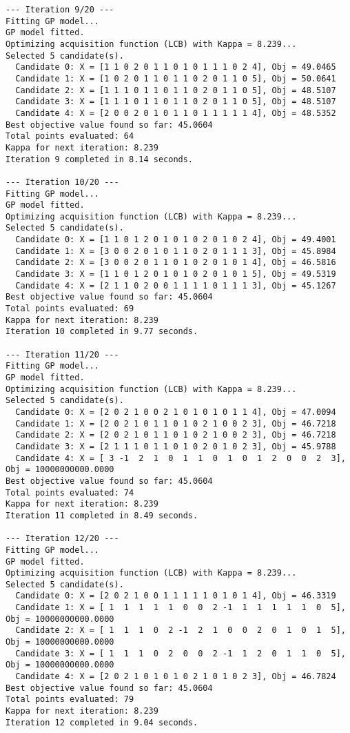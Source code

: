 \documentclass[
  letterpaper,
  DIV=11,
  numbers=noendperiod]{scrartcl}
\begin{document}
\begin{verbatim}
--- Iteration 9/20 ---
Fitting GP model...
GP model fitted.
Optimizing acquisition function (LCB) with Kappa = 8.239...
Selected 5 candidate(s).
  Candidate 0: X = [1 1 0 2 0 1 1 0 1 0 1 1 1 0 2 4], Obj = 49.0465
  Candidate 1: X = [1 0 2 0 1 1 0 1 1 0 2 0 1 1 0 5], Obj = 50.0641
  Candidate 2: X = [1 1 1 0 1 1 0 1 1 0 2 0 1 1 0 5], Obj = 48.5107
  Candidate 3: X = [1 1 1 0 1 1 0 1 1 0 2 0 1 1 0 5], Obj = 48.5107
  Candidate 4: X = [2 0 0 2 0 1 0 1 1 0 1 1 1 1 1 4], Obj = 48.5352
Best objective value found so far: 45.0604
Total points evaluated: 64
Kappa for next iteration: 8.239
Iteration 9 completed in 8.14 seconds.

--- Iteration 10/20 ---
Fitting GP model...
GP model fitted.
Optimizing acquisition function (LCB) with Kappa = 8.239...
Selected 5 candidate(s).
  Candidate 0: X = [1 1 0 1 2 0 1 0 1 0 2 0 1 0 2 4], Obj = 49.4001
  Candidate 1: X = [3 0 0 2 0 1 0 1 1 0 2 0 1 1 1 3], Obj = 45.8984
  Candidate 2: X = [3 0 0 2 0 1 1 0 1 0 2 0 1 0 1 4], Obj = 46.5816
  Candidate 3: X = [1 1 0 1 2 0 1 0 1 0 2 0 1 0 1 5], Obj = 49.5319
  Candidate 4: X = [2 1 1 0 2 0 0 1 1 1 1 0 1 1 1 3], Obj = 45.1267
Best objective value found so far: 45.0604
Total points evaluated: 69
Kappa for next iteration: 8.239
Iteration 10 completed in 9.77 seconds.

--- Iteration 11/20 ---
Fitting GP model...
GP model fitted.
Optimizing acquisition function (LCB) with Kappa = 8.239...
Selected 5 candidate(s).
  Candidate 0: X = [2 0 2 1 0 0 2 1 0 1 0 1 0 1 1 4], Obj = 47.0094
  Candidate 1: X = [2 0 2 1 0 1 1 0 1 0 2 1 0 0 2 3], Obj = 46.7218
  Candidate 2: X = [2 0 2 1 0 1 1 0 1 0 2 1 0 0 2 3], Obj = 46.7218
  Candidate 3: X = [2 1 1 1 0 1 1 0 1 0 2 0 1 0 2 3], Obj = 45.9788
  Candidate 4: X = [ 3 -1  2  1  0  1  1  0  1  0  1  2  0  0  2  3], Obj = 10000000000.0000
Best objective value found so far: 45.0604
Total points evaluated: 74
Kappa for next iteration: 8.239
Iteration 11 completed in 8.49 seconds.

--- Iteration 12/20 ---
Fitting GP model...
GP model fitted.
Optimizing acquisition function (LCB) with Kappa = 8.239...
Selected 5 candidate(s).
  Candidate 0: X = [2 0 2 1 0 0 1 1 1 1 1 0 1 0 1 4], Obj = 46.3319
  Candidate 1: X = [ 1  1  1  1  1  0  0  2 -1  1  1  1  1  1  0  5], Obj = 10000000000.0000
  Candidate 2: X = [ 1  1  1  0  2 -1  2  1  0  0  2  0  1  0  1  5], Obj = 10000000000.0000
  Candidate 3: X = [ 1  1  1  0  2  0  0  2 -1  1  2  0  1  1  0  5], Obj = 10000000000.0000
  Candidate 4: X = [2 0 2 1 0 1 0 1 0 2 1 0 1 0 2 3], Obj = 46.7824
Best objective value found so far: 45.0604
Total points evaluated: 79
Kappa for next iteration: 8.239
Iteration 12 completed in 9.04 seconds.


\end{verbatim}
\end{document}
